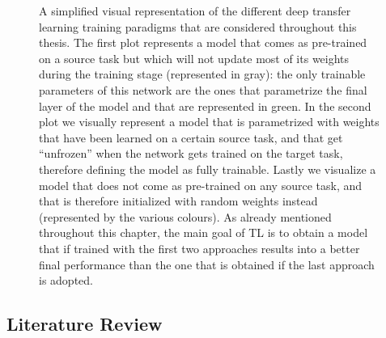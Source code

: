 \begin{figure}[!htb]
\endminipage
\caption{A simplified visual representation of the different deep transfer learning training paradigms that are considered throughout this thesis. The first plot represents a model that comes as pre-trained on a source task but which will not update most of its weights during the training stage (represented in gray): the only trainable parameters of this network are the ones that parametrize the final layer of the model and that are represented in green. In the second plot we visually represent a model that is parametrized with weights that have been learned on a certain source task, and that get ``unfrozen'' when the network gets trained on the target task, therefore defining the model as fully trainable. Lastly we visualize a model that does not come as pre-trained on any source task, and that is therefore initialized with random weights instead (represented by the various colours). As already mentioned throughout this chapter, the main goal of TL is to obtain a model that if trained with the first two approaches results into a better final performance than the one that is obtained if the last approach is adopted.}
\label{fig:network_training_approaches}
\end{figure}


\subsection{Literature Review}

